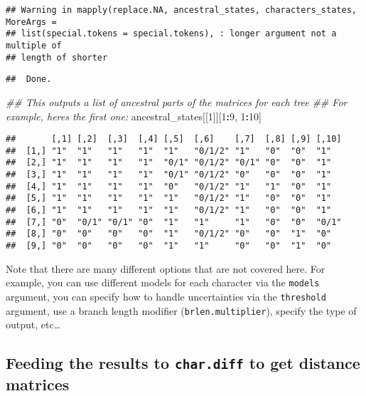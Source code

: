 \documentclass[
]{book}
\newenvironment{Shaded}{\begin{snugshade}}{\end{snugshade}}
\newcommand{\CommentTok}[1]{\textcolor[rgb]{0.56,0.35,0.01}{\textit{#1}}}
\newcommand{\DecValTok}[1]{\textcolor[rgb]{0.00,0.00,0.81}{#1}}
\newcommand{\NormalTok}[1]{#1}
\newcommand{\OperatorTok}[1]{\textcolor[rgb]{0.81,0.36,0.00}{\textbf{#1}}}
\begin{document}
\begin{verbatim}
## Warning in mapply(replace.NA, ancestral_states, characters_states, MoreArgs =
## list(special.tokens = special.tokens), : longer argument not a multiple of
## length of shorter
\end{verbatim}

\begin{verbatim}
##  Done.
\end{verbatim}

\begin{Shaded}
\begin{Highlighting}[]
\CommentTok{\#\# This outputs a list of ancestral parts of the matrices for each tree}
\CommentTok{\#\# For example, here\textquotesingle{}s the first one:}
\NormalTok{ancestral\_states[[}\DecValTok{1}\NormalTok{]][}\DecValTok{1}\OperatorTok{:}\DecValTok{9}\NormalTok{, }\DecValTok{1}\OperatorTok{:}\DecValTok{10}\NormalTok{]}
\end{Highlighting}
\end{Shaded}

\begin{verbatim}
##       [,1] [,2]  [,3]  [,4] [,5]  [,6]    [,7]  [,8] [,9] [,10]
##  [1,] "1"  "1"   "1"   "1"  "1"   "0/1/2" "1"   "0"  "0"  "1"  
##  [2,] "1"  "1"   "1"   "1"  "0/1" "0/1/2" "0/1" "0"  "0"  "1"  
##  [3,] "1"  "1"   "1"   "1"  "0/1" "0/1/2" "0"   "0"  "0"  "1"  
##  [4,] "1"  "1"   "1"   "1"  "0"   "0/1/2" "1"   "1"  "0"  "1"  
##  [5,] "1"  "1"   "1"   "1"  "1"   "0/1/2" "1"   "0"  "0"  "1"  
##  [6,] "1"  "1"   "1"   "1"  "1"   "0/1/2" "1"   "0"  "0"  "1"  
##  [7,] "0"  "0/1" "0/1" "0"  "1"   "1"     "1"   "0"  "0"  "0/1"
##  [8,] "0"  "0"   "0"   "0"  "1"   "0/1/2" "0"   "0"  "1"  "0"  
##  [9,] "0"  "0"   "0"   "0"  "1"   "1"     "0"   "0"  "1"  "0"
\end{verbatim}

Note that there are many different options that are not covered here.
For example, you can use different models for each character via the \texttt{models} argument, you can specify how to handle uncertainties via the \texttt{threshold} argument, use a branch length modifier (\texttt{brlen.multiplier}), specify the type of output, etc\ldots{}

\hypertarget{feeding-the-results-to-char.diff-to-get-distance-matrices}{%
\subsection{\texorpdfstring{Feeding the results to \texttt{char.diff} to get distance matrices}{Feeding the results to char.diff to get distance matrices}}\label{feeding-the-results-to-char.diff-to-get-distance-matrices}}
\end{document}
